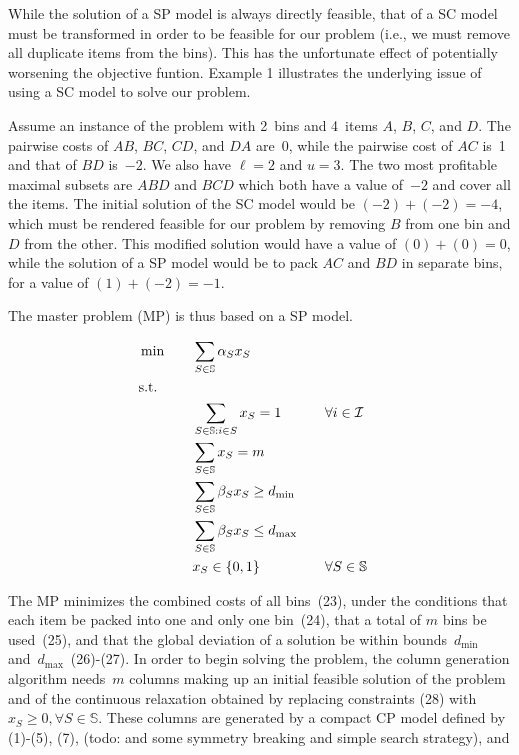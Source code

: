 \documentclass{llncs}
\begin{document}
While the solution of a SP model is always directly feasible, that of a SC model must be transformed in order to be feasible for our problem (i.e., we must remove all duplicate items from the bins). This has the unfortunate effect of potentially worsening the objective funtion. Example 1 illustrates the underlying issue of using a SC model to solve our problem.

\begin{example}
  Assume an instance of the problem with 2~bins and 4~items $A$, $B$, $C$, and $D$. The pairwise costs of $AB$, $BC$, $CD$, and $DA$ are~0, while the pairwise cost of $AC$ is~1 and that of $BD$ is~$-2$. We also have $\ell=2$ and $u=3$. The two most profitable maximal subsets are $ABD$ and $BCD$ which both have a value of~$-2$ and cover all the items. The initial solution of the SC model would be $(-2)+(-2)=-4$, which must be rendered feasible for our problem by removing $B$ from one bin and $D$ from the other. This modified solution would have a value of $(0)+(0)=0$, while the solution of a SP model would be to pack $AC$ and $BD$ in separate bins, for a value of $(1)+(-2)=-1$.
\end{example}

The master problem (MP) is thus based on a SP model.

\begin{alignat}{3}
  & \min \quad && \sum \limits_{S \in \mathbb{S}} \alpha_{S} x_{S} \\
  &\textrm{s.t.} \notag \\
  &&& \sum \limits_{S \in \mathbb{S}:i \in S} x_{S} = 1 && \quad \forall i \in \mathcal{I} \\
  &&& \sum \limits_{S \in \mathbb{S}} x_{S} = m \\
  &&& \sum \limits_{S \in \mathbb{S}} \beta_{S} x_{S} \geq d_{\min} && \\
  &&& \sum \limits_{S \in \mathbb{S}} \beta_{S} x_{S} \leq d_{\max} && \\
  &&& x_{S} \in \{0, 1\} && \quad \forall S \in \mathbb{S}
\end{alignat}

The MP minimizes the combined costs of all bins~(23), under the conditions that each item be packed into one and only one bin~(24), that a total of $m$ bins be used~(25), and that the global deviation of a solution be within bounds~$d_{\min}$ and~$d_{\max}$~(26)-(27). In order to begin solving the problem, the column generation algorithm needs~$m$ columns making up an initial feasible solution of the problem and of the continuous relaxation obtained by replacing constraints (28) with $x_{S} \geq 0, \forall S \in \mathbb{S}$. These columns are generated by a compact CP model defined by (1)-(5), (7), (todo: and some symmetry breaking and simple search strategy), and
\end{document}
